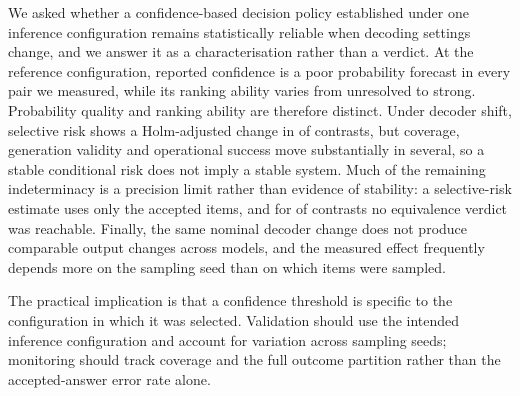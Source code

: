 \documentclass[information,article,submit,moreauthors]{Definitions/mdpi}
\begin{document}
We asked whether a confidence-based decision policy established under one
inference configuration remains statistically reliable when decoding settings
change, and we answer it as a characterisation rather than a verdict. At the
reference configuration, reported confidence is a poor probability forecast in
every pair we measured, while its ranking ability varies from unresolved to
strong. Probability quality and ranking ability are therefore distinct. Under
decoder shift, selective risk shows a Holm-adjusted change in
\NumChangeDetected{} of \NumContrasts{} contrasts,
but coverage, generation validity and operational success move substantially in
several, so a stable conditional risk does not imply a stable system. Much of
the remaining indeterminacy is a precision limit rather than evidence of
stability: a selective-risk estimate uses only the accepted items, and for
\NumCannotFitBand{} of \NumContrasts{} contrasts no equivalence
verdict was reachable. Finally, the same nominal decoder change does not produce
comparable output changes across models, and the measured effect frequently
depends more on the sampling seed than on which items were sampled.

The practical implication is that a confidence threshold is specific to the
configuration in which it was selected. Validation should use the intended
inference configuration and account for variation across sampling seeds;
monitoring should track coverage and the full outcome partition rather than the
accepted-answer error rate alone.

\vspace{6pt}



\end{document}
